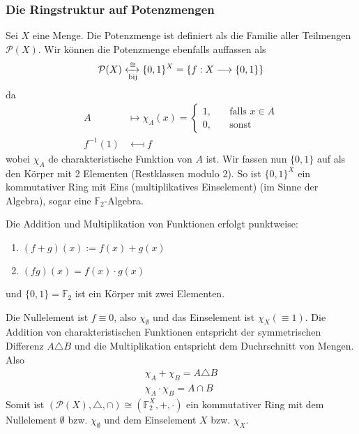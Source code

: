 \subsubsection{Die Ringstruktur auf Potenzmengen}
Sei $X$ eine Menge. Die Potenzmenge ist definiert als die Familie aller Teilmengen $\mathcal{P}(X)$. Wir können die Potenzmenge ebenfalls auffassen als
\begin{equation*}
\mathcal{P}(X) \xleftrightarrow[\text{bij}]{\cong} \{0,1\}^X = \{f:X \longrightarrow \{0,1\}\}
\end{equation*}
da
\begin{align*}
A &\longmapsto \chi_A(x) = \begin{cases}
1, \quad & \text{falls } x\in A\\
0, \quad & \text{sonst}
\end{cases}\\
f^{-1}(1) & \longmapsfrom f
\end{align*}
wobei $\chi_A$ de charakteristische Funktion von $A$ ist. \newline \newline
Wir fassen nun $\{0,1\}$ auf als den Körper mit 2 Elementen (Restklassen modulo 2). So ist $\{0,1\}^X$ ein kommutativer Ring mit Eins (multiplikatives Einselement) (im Sinne der Algebra), sogar eine $\mathbb{F}_2$-Algebra.
\begin{remark} Die Addition und Multiplikation von Funktionen erfolgt punktweise:
\begin{enumerate} [-, itemsep=0pt,topsep=3pt]
\item  $(f+g)(x) := f(x)+g(x)$ 
\item $(fg)(x)= f(x) \cdot g(x)$
\end{enumerate}
und $\{0,1\} = \mathbb{F}_2$ ist ein Körper mit zwei Elementen.
\end{remark}
Die Nullelement ist $f \equiv 0$, also $\chi_\emptyset$ und das Einselement ist $\chi_X (\equiv 1)$. Die Addition von charakteristischen Funktionen entspricht der symmetrischen Differenz $A \triangle B$ und die Multiplikation entspricht dem Duchrschnitt von Mengen. Also
\begin{align*}
\chi_A + \chi_B = A \triangle B \\
\chi_A \cdot \chi_B = A \cap B
\end{align*}
Somit ist $(\mathcal{P}(X), \triangle, \cap) \cong (\mathbb{F}_2^X, +, \cdot)$ ein kommutativer Ring mit dem Nullelement $\emptyset$ bzw. $\chi_\emptyset$ und dem Einselement $X$ bzw. $\chi_X$. 
